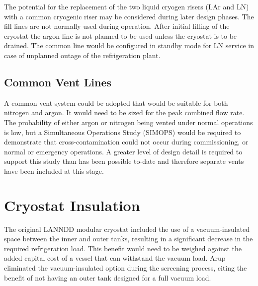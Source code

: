 The potential for the replacement of the two liquid cryogen risers (LAr and LN) with
 a common cryogenic riser may be considered during later design phases. The fill lines are not
 normally used during operation. After initial filling of the cryostat the argon line is not planned
 to be used unless the cryostat is to be drained. The common line would be configured in standby
 mode for LN service in case of unplanned outage of the refrigeration plant.


\subsection{Common Vent Lines}

A common vent system could be adopted that would be suitable for both nitrogen and
 argon. It would need to be sized for the peak combined flow rate. The probability of either argon
 or nitrogen being vented under normal operations is low, but a Simultaneous Operations Study
 (SIMOPS) would be required to demonstrate that cross-contamination could not occur during
 commissioning, or normal or emergency operations. A greater level of design detail is required to
 support this study than has been possible to-date and therefore separate vents have been included
 at this stage.



\section{Cryostat Insulation}

The original LANNDD modular cryostat included the use of a vacuum-insulated space between the inner and outer tanks, resulting in a significant decrease in the required refrigeration
load. This benefit would need to be weighed against the added capital cost of a vessel that can
withstand the vacuum load. Arup eliminated the vacuum-insulated option during the screening
process, citing the benefit of not having an outer tank designed for a full vacuum load.


